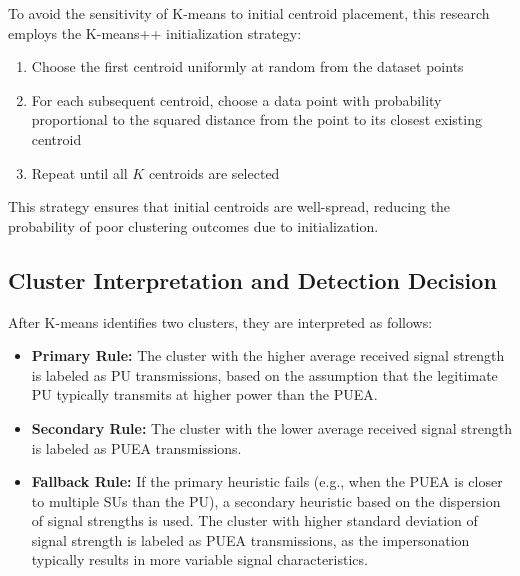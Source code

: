 To avoid the sensitivity of K-means to initial centroid placement, this research employs the K-means++ initialization strategy:

\begin{enumerate}
    \item Choose the first centroid uniformly at random from the dataset points
    \item For each subsequent centroid, choose a data point with probability proportional to the squared distance from the point to its closest existing centroid
    \item Repeat until all $K$ centroids are selected
\end{enumerate}

This strategy ensures that initial centroids are well-spread, reducing the probability of poor clustering outcomes due to initialization.

\subsection{Cluster Interpretation and Detection Decision}

After K-means identifies two clusters, they are interpreted as follows:

\begin{tcolorbox}[colback=blue!5, colframe=blue!75!black, title=Cluster Classification Rules, left=2pt, right=2pt]
\begin{itemize}
    \item \textbf{Primary Rule:} The cluster with the higher average received signal strength is labeled as PU transmissions, based on the assumption that the legitimate PU typically transmits at higher power than the PUEA.
    
    \item \textbf{Secondary Rule:} The cluster with the lower average received signal strength is labeled as PUEA transmissions.
    
    \item \textbf{Fallback Rule:} If the primary heuristic fails (e.g., when the PUEA is closer to multiple SUs than the PU), a secondary heuristic based on the dispersion of signal strengths is used. The cluster with higher standard deviation of signal strength is labeled as PUEA transmissions, as the impersonation typically results in more variable signal characteristics.
\end{itemize}
\end{tcolorbox}

